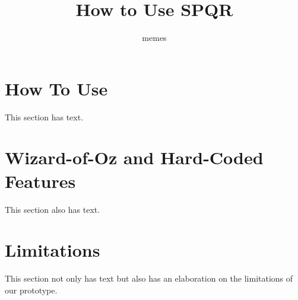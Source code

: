 \documentclass{article}
\title{How to Use SPQR}
\author{memes}
\begin{document}
\maketitle

\section{How To Use}
This section has text.

\section{Wizard-of-Oz and Hard-Coded Features}
This section also has text.


\section{Limitations}
This section not only has text but also has an elaboration on the limitations of our prototype.
\end{document}
